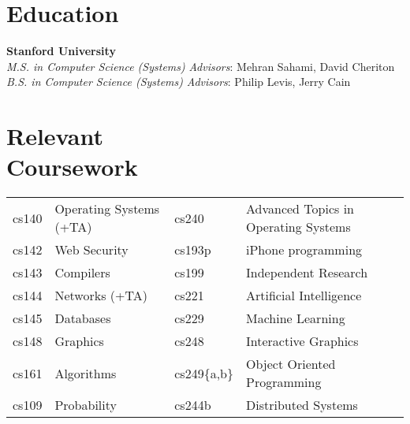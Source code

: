 \documentclass[margin,line]{resume}
\begin{document}
\begin{resume}


    \section{\mysidestyle Education}

    \textbf{Stanford University} \vspace{2mm}\\\vspace{1mm}%
    \textsl{M.S. in Computer Science (Systems)}  \hfill \emph{Advisors}: Mehran Sahami, David Cheriton\\
    \textsl{B.S. in Computer Science (Systems)}  \hfill \emph{Advisors}: Philip Levis, Jerry Cain

    \section{\mysidestyle Relevant \\ Coursework}
    \begin{tabular}{llll}
cs140  & Operating Systems (+TA) \hspace{0.15\textwidth}
                             &  cs240  & Advanced Topics in Operating Systems \\
cs142  & Web Security        &  cs193p & iPhone programming     \\
cs143  & Compilers           &  cs199  & Independent Research    \\
cs144  & Networks (+TA)      &  cs221  & Artificial Intelligence \\
cs145  & Databases           &  cs229  & Machine Learning        \\
cs148  & Graphics            &  cs248  & Interactive Graphics  \\
cs161  & Algorithms          &  cs249\{a,b\} & Object Oriented Programming \\
cs109  & Probability         &  cs244b & Distributed Systems    \\
    \end{tabular}



\end{resume}
\end{document}
